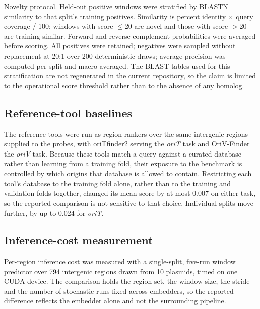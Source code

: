 Novelty protocol. Held-out positive windows were stratified by BLASTN
similarity to that split's training positives. Similarity is percent identity
$\times$ query coverage / 100; windows with score $\leq$20 are novel and
those with score $>$20 are training-similar. Forward and reverse-complement
probabilities were averaged before scoring. All positives were retained;
negatives were sampled without replacement at 20:1 over 200 deterministic
draws; average precision was computed per split and macro-averaged. The BLAST
tables used for this stratification are not regenerated in the current
repository, so the claim is limited to the operational score threshold rather
than to the absence of any homolog.

\subsection*{Reference-tool baselines}

The reference tools were run as region rankers over the same intergenic
regions supplied to the probes, with oriTfinder2 serving the \emph{oriT} task
and OriV-Finder the \emph{oriV} task. Because these tools match a query
against a curated database rather than learning from a training fold, their
exposure to the benchmark is controlled by which origins that database is
allowed to contain. Restricting each tool's database to the training fold
alone, rather than to the training and validation folds together, changed its
mean score by at most 0.007 on either task, so the reported comparison is not
sensitive to that choice. Individual splits move further, by up to 0.024 for
\emph{oriT}.

\subsection*{Inference-cost measurement}

Per-region inference cost was measured with a single-split, five-run window
predictor over 794 intergenic regions drawn from 10 plasmids, timed on one
CUDA device. The comparison holds the region set, the window size, the stride
and the number of stochastic runs fixed across embedders, so the reported
difference reflects the embedder alone and not the surrounding pipeline.
